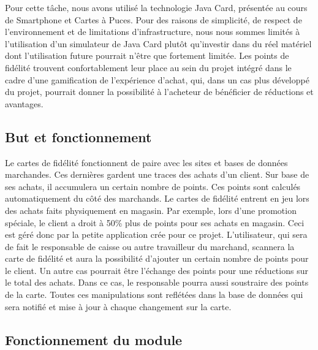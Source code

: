 Pour cette tâche, nous avons utilisé la technologie Java Card, présentée au cours de Smartphone et
Cartes à Puces. Pour des raisons de simplicité, de respect de l'environnement et de limitations
d'infrastructure, nous nous sommes limités à l'utilisation d'un simulateur de Java Card plutôt
qu'investir dans du réel matériel dont l'utilisation future pourrait n'être que fortement limitée.
Les points de fidélité trouvent confortablement leur place au sein du projet intégré dans le cadre d'une
gamification de l'expérience d'achat, qui, dans un cas plus développé du projet, pourrait donner la
possibilité à l'acheteur de bénéficier de réductions et avantages.

\subsection{But et fonctionnement}

Le cartes de fidélité fonctionnent de paire avec les sites et bases de données marchandes. Ces
dernières gardent une traces des achats d'un client. Sur base de ses achats, il accumulera un certain
nombre de points. Ces points sont calculés automatiquement du côté des marchands. Le cartes de
fidélité entrent en jeu lors des achats faits physiquement en magasin. Par exemple, lors d'une
promotion spéciale, le client a droit à 50\% plus de points pour ses achats en magasin. Ceci est géré
donc par la petite application crée pour ce projet. L'utilisateur, qui sera de fait le responsable de caisse
ou autre travailleur du marchand, scannera la carte de fidélité et aura la possibilité d'ajouter un certain
nombre de points pour le client. Un autre cas pourrait être l'échange des points pour une réductions
sur le total des achats. Dans ce cas, le responsable pourra aussi soustraire des points de la carte. Toutes
ces manipulations sont reflétées dans la base de données qui sera notifié et mise à jour à chaque
changement sur la carte.

\subsection{Fonctionnement du module}

